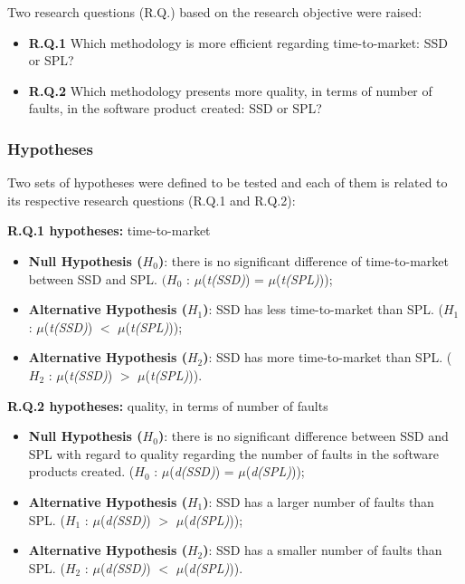 Two research questions (R.Q.) based on the research objective were raised:

\begin{itemize}
\setlength\itemsep{0.8em}
\item \textbf{R.Q.1} Which methodology is more efficient regarding time-to-market: SSD or SPL?
\item \textbf{R.Q.2} Which methodology presents more quality, in terms of number of faults, in the software product created: SSD or SPL?
\end{itemize}

\subsubsection*{Hypotheses}

Two sets of hypotheses were defined to be tested and each of them is related to its respective research questions (R.Q.1 and R.Q.2):

\vspace{1em}
\textbf{R.Q.1 hypotheses:} time-to-market

	\begin{itemize}
    \setlength\itemsep{0.8em}
	\item \textbf{Null Hypothesis ($H_{0}$)}: there is no significant difference of time-to-market between SSD and SPL. $(H_{0}$ : $\mu$(\textit{t(SSD)}) =  $\mu$(\textit{t(SPL)}));
	
	\item \textbf{Alternative Hypothesis ($H_{1}$)}: SSD has less time-to-market than SPL. 	($H_{1}$ : $\mu$(\textit{t(SSD)}) $<$ $\mu$(\textit{t(SPL)}));
		
	\item \textbf{Alternative Hypothesis ($H_{2}$)}: SSD has more time-to-market than SPL. 	($H_{2}$ :  $\mu$(\textit{t(SSD)}) $>$ $\mu$(\textit{t(SPL)})).		
	\end{itemize}	

\vspace{1em}
\textbf{R.Q.2 hypotheses:}
quality, in terms of number of faults
	\begin{itemize}
    \setlength\itemsep{0.8em}
	
	\item \textbf{Null Hypothesis ($H_{0}$)}: there is no significant difference between SSD and SPL with regard to quality regarding the number of faults in the software products created. 	($H_{0}$ : $\mu$(\textit{d(SSD)}) =  $\mu$(\textit{d(SPL)}));
	
	\item \textbf{Alternative Hypothesis ($H_{1}$)}: SSD has a larger number of faults than SPL. ($H_{1}$ : $\mu$(\textit{d(SSD)}) $>$ $\mu$(\textit{d(SPL)}));
		
	\item \textbf{Alternative Hypothesis ($H_{2}$)}: SSD has a smaller number of faults than SPL. ($H_{2}$ :  $\mu$(\textit{d(SSD)}) $<$ $\mu$(\textit{d(SPL)})).		
	
	\end{itemize}


